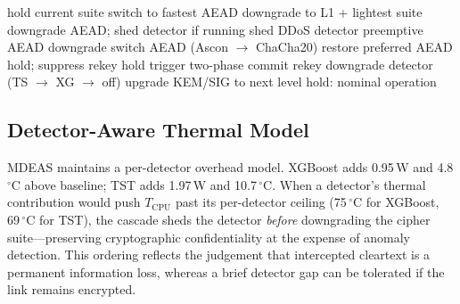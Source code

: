 \documentclass[conference]{IEEEtran}
\newcommand{\mdeas}{\textsc{MDEAS}}
\begin{document}
\begin{algorithm}[t]
\caption{\mdeas{} Policy Cascade (1\,s period)}
\label{alg:mdeas}
\footnotesize
\begin{algorithmic}[1]
  \State hold current suite 
  \State switch to fastest AEAD 
  \State downgrade to L1 + lightest suite
  \State downgrade AEAD; shed detector if running
  \State shed DDoS detector
  \State preemptive AEAD downgrade 
  \State switch AEAD (Ascon $\to$ ChaCha20)
  \State restore preferred AEAD
  \State hold; suppress rekey
  \State hold 
  \State trigger two-phase commit rekey
  \State downgrade detector (TS $\to$ XG $\to$ off)
  \State upgrade KEM/SIG to next level
\Else
  \State hold: nominal operation
\EndIf
\end{algorithmic}
\end{algorithm}

\subsection{Detector-Aware Thermal Model}
\label{sec:detector-budget}

\mdeas{} maintains a per-detector overhead model.  XGBoost adds
0.95\,W and 4.8\,$^\circ$C above baseline; TST adds 1.97\,W and
10.7\,$^\circ$C.  When a detector's thermal contribution would
push $T_\text{CPU}$ past its per-detector ceiling (75\,$^\circ$C for
XGBoost, 69\,$^\circ$C for TST), the cascade sheds the detector
\emph{before} downgrading the cipher suite---preserving
cryptographic confidentiality at the expense of anomaly detection.
This ordering reflects the judgement that intercepted cleartext is a
permanent information loss, whereas a brief detector gap can be
tolerated if the link remains encrypted.


\end{document}
